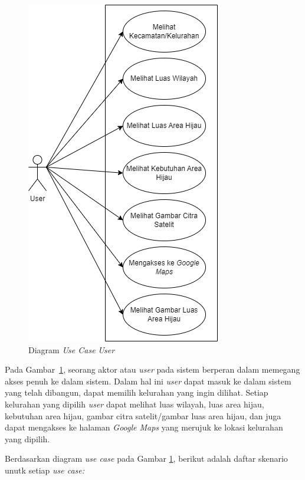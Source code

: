 \begin{figure}[H]
	\centering
	\includegraphics[scale=0.5]{Gambar/UseCaseUser.png}
	\caption[Diagram \textit{Use Case} \textit{User}]{Diagram \textit{Use Case} \textit{User}}
	\label{fig:useCaseUser}
\end{figure}

Pada Gambar~\ref{fig:useCaseUser}, seorang aktor atau \textit{user} pada sistem berperan dalam memegang akses penuh ke dalam sistem. Dalam hal ini \textit{user} dapat masuk ke dalam sistem yang telah dibangun, dapat memilih kelurahan yang ingin dilihat. Setiap kelurahan yang dipilih \textit{user} dapat melihat luas wilayah, luas area hijau, kebutuhan area hijau, gambar citra satelit/gambar luas area hijau, dan juga dapat mengakses ke halaman \textit{Google Maps} yang merujuk ke lokasi kelurahan yang dipilih.
	
Berdasarkan diagram \textit{use case }pada Gambar \ref{fig:useCaseUser}, berikut adalah daftar skenario unutk setiap \textit{use case:}	

